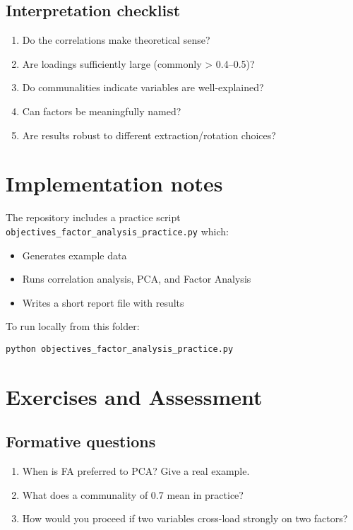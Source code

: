 \documentclass[a4paper,11pt]{tufte-book}
\begin{document}
\subsection{Interpretation checklist}
\begin{enumerate}
  \item Do the correlations make theoretical sense?
  \item Are loadings sufficiently large (commonly > 0.4--0.5)?
  \item Do communalities indicate variables are well-explained?
  \item Can factors be meaningfully named?
  \item Are results robust to different extraction/rotation choices?
\end{enumerate}

\section{Implementation notes}
The repository includes a practice script \verb|objectives_factor_analysis_practice.py| which:
\begin{itemize}
  \item Generates example data
  \item Runs correlation analysis, PCA, and Factor Analysis
  \item Writes a short report file with results
\end{itemize}

To run locally from this folder:
\begin{verbatim}
python objectives_factor_analysis_practice.py
\end{verbatim}

\section{Exercises and Assessment}
\subsection{Formative questions}
\begin{enumerate}
  \item When is FA preferred to PCA? Give a real example.
  \item What does a communality of 0.7 mean in practice?
  \item How would you proceed if two variables cross-load strongly on two factors?
\end{enumerate}
\end{document}
